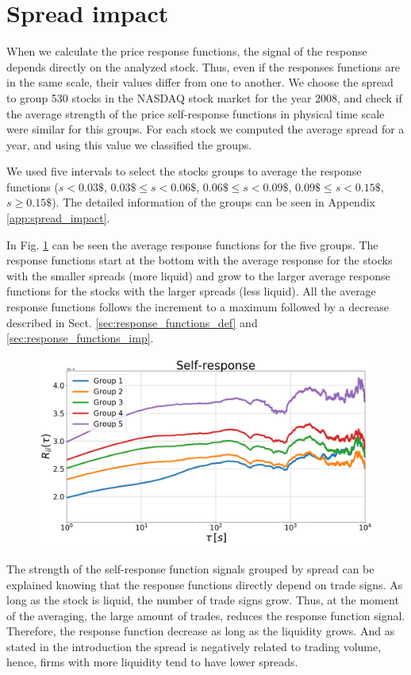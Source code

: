 \section{Spread impact}\label{sec:spread_impact}

When we calculate the price response functions, the signal of the response depends
directly on the analyzed stock. Thus, even if the responses functions are in
the same scale, their values differ from one to another. We choose the spread
to group 530 stocks in the NASDAQ stock market for the year 2008, and check if
the average strength of the price self-response functions in physical time scale were
similar for this groups. For each stock we computed the average spread for a
year, and using this value we classified the groups.

We used five intervals to select the stocks groups to average the response
functions ($s<0.03\$$, $0.03\$ \le s <0.06\$$, $0.06\$ \le s <0.09\$$,
$0.09\$ \le s <0.15\$$, $s \ge 0.15\$$). The detailed information of the groups
can be seen in Appendix \ref{app:spread_impact}.

In Fig. \ref{fig:spread_impact} can be seen the average response functions for
the five groups. The response functions start at the bottom with the average
response for the stocks with the smaller spreads (more liquid) and grow to the
larger average response functions for the stocks with the larger spreads (less
liquid). All the average response functions follows the increment to a maximum
followed by a decrease described in Sect. \ref{sec:response_functions_def} and
\ref{sec:response_functions_imp}.

\begin{figure}[htbp]
    \centering
    \includegraphics[width=\columnwidth]{figures/06_spread_impact.png}
    \caption{}
    \label{fig:spread_impact}
\end{figure}

The strength of the self-response function signals grouped by spread can be
explained knowing that the response functions directly depend on trade signs.
As long as the stock is liquid, the number of trade signs grow. Thus, at the
moment of the averaging, the large amount of trades, reduces the response
function signal. Therefore, the response function decrease as long as the
liquidity grows. And as stated in the introduction the spread is negatively
related to trading volume, hence, firms with more liquidity tend to have lower
spreads.
